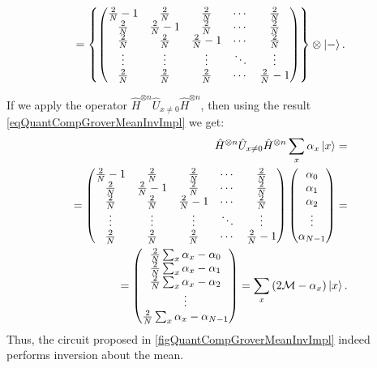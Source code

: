 \begin{eqnarray}
=
\left\{
\begin{pmatrix}
\frac{2}{N} - 1  & \frac{2}{N} & \frac{2}{N} & \cdots & \frac{2}{N} \\
\frac{2}{N} & \frac{2}{N} - 1 & \frac{2}{N} & \cdots & \frac{2}{N} \\
\frac{2}{N} & \frac{2}{N} & \frac{2}{N} - 1 & \cdots & \frac{2}{N} \\
\vdots & \vdots & \vdots & \ddots & \vdots \\
\frac{2}{N} & \frac{2}{N} & \frac{2}{N} & \cdots & \frac{2}{N} - 1\\
\end{pmatrix}
\right\}
\otimes \ket{-}.
\label{eqQuantCompGroverMeanInvImpl}
\end{eqnarray}

If we apply the operator $\hat{H}^{\otimes n}\hat{U}_{x \ne
  0}\hat{H}^{\otimes n}$, then using the result \eqref{eqQuantCompGroverMeanInvImpl} we get:
\begin{eqnarray}
\hat{H}^{\otimes n}\hat{U}_{x \ne
  0}\hat{H}^{\otimes n} \sum_x \alpha_x \ket{ x } = 
\nonumber \\
=
\begin{pmatrix}
\frac{2}{N} - 1  & \frac{2}{N} & \frac{2}{N} & \cdots & \frac{2}{N} \\
\frac{2}{N} & \frac{2}{N} - 1 & \frac{2}{N} & \cdots & \frac{2}{N} \\
\frac{2}{N} & \frac{2}{N} & \frac{2}{N} - 1 & \cdots & \frac{2}{N} \\
\vdots & \vdots & \vdots & \ddots & \vdots \\
\frac{2}{N} & \frac{2}{N} & \frac{2}{N} & \cdots & \frac{2}{N} - 1\\
\end{pmatrix}
\begin{pmatrix}
\alpha_0 \\
\alpha_1 \\
\alpha_2 \\
\vdots \\
\alpha_{N - 1} \\
\end{pmatrix}
=
\nonumber \\
=
\begin{pmatrix}
\frac{2}{N}\sum_x\alpha_x - \alpha_0\\
\frac{2}{N}\sum_x\alpha_x - \alpha_1\\
\frac{2}{N}\sum_x\alpha_x - \alpha_2\\
\vdots \\
\frac{2}{N}\sum_x\alpha_x - \alpha_{N-1}\\
\end{pmatrix} = 
\sum_x \left(2 \mathcal{M} - \alpha_x \right)\ket{ x }.
\nonumber
\end{eqnarray}
Thus, the circuit proposed in \autoref{figQuantCompGroverMeanInvImpl} indeed performs inversion about the mean.